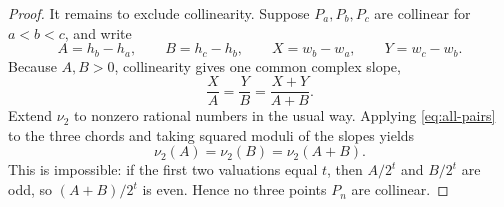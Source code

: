 \documentclass[10pt,a4paper]{amsart}
\newcommand{\vTwo}{\nu_2}
\begin{document}
\begin{proof}
It remains to exclude collinearity.  Suppose $P_a,P_b,P_c$ are collinear for
$a<b<c$, and write
\[
 A=h_b-h_a,\qquad B=h_c-h_b,
 \qquad X=w_b-w_a,\qquad Y=w_c-w_b.
\]
Because $A,B>0$, collinearity gives one common complex slope,
\[
 \frac XA=\frac YB=\frac{X+Y}{A+B}.
\]
Extend $\vTwo$ to nonzero rational numbers in the usual way.  Applying
\eqref{eq:all-pairs} to the three chords and taking squared moduli of the
slopes yields
\[
 \vTwo(A)=\vTwo(B)=\vTwo(A+B).
\]
This is impossible: if the first two valuations equal $t$, then $A/2^t$ and
$B/2^t$ are odd, so $(A+B)/2^t$ is even.  Hence no three points $P_n$ are
collinear.
\end{proof}
\end{document}
